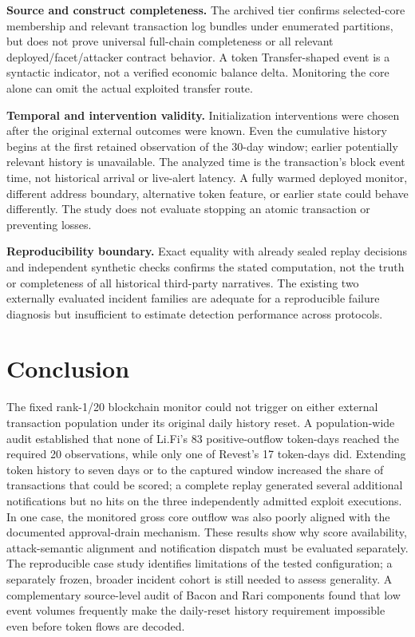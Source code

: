 \documentclass[preprint,12pt,authoryear]{elsarticle}
\begin{document}
\textbf{Source and construct completeness.} The archived tier confirms selected-core membership and relevant transaction log bundles under enumerated partitions, but does not prove universal full-chain completeness or all relevant deployed/facet/attacker contract behavior. A token Transfer-shaped event is a syntactic indicator, not a verified economic balance delta. Monitoring the core alone can omit the actual exploited transfer route.

\textbf{Temporal and intervention validity.} Initialization interventions were chosen after the original external outcomes were known. Even the cumulative history begins at the first retained observation of the 30-day window; earlier potentially relevant history is unavailable. The analyzed time is the transaction's block event time, not historical arrival or live-alert latency. A fully warmed deployed monitor, different address boundary, alternative token feature, or earlier state could behave differently. The study does not evaluate stopping an atomic transaction or preventing losses.

\textbf{Reproducibility boundary.} Exact equality with already sealed replay decisions and independent synthetic checks confirms the stated computation, not the truth or completeness of all historical third-party narratives. The existing two externally evaluated incident families are adequate for a reproducible failure diagnosis but insufficient to estimate detection performance across protocols.

\section{Conclusion}\label{conclusion}

The fixed rank-1/20 blockchain monitor could not trigger on either external transaction population under its original daily history reset. A population-wide audit established that none of Li.Fi's 83 positive-outflow token-days reached the required 20 observations, while only one of Revest's 17 token-days did. Extending token history to seven days or to the captured window increased the share of transactions that could be scored; a complete replay generated several additional notifications but no hits on the three independently admitted exploit executions. In one case, the monitored gross core outflow was also poorly aligned with the documented approval-drain mechanism. These results show why score availability, attack-semantic alignment and notification dispatch must be evaluated separately. The reproducible case study identifies limitations of the tested configuration; a separately frozen, broader incident cohort is still needed to assess generality. A complementary source-level audit of Bacon and Rari components found that low event volumes frequently make the daily-reset history requirement impossible even before token flows are decoded.
\end{document}
